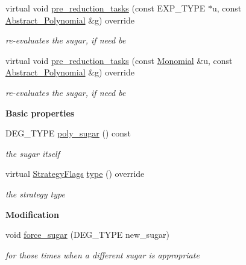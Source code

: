 \begin{DoxyCompactItemize}
virtual void \hyperlink{group__strategygroup_a284ca31b353017bdf4ea9b331218fff4}{pre\+\_\+reduction\+\_\+tasks} (const E\+X\+P\+\_\+\+T\+Y\+PE $\ast$u, const \hyperlink{group__polygroup_class_abstract___polynomial}{Abstract\+\_\+\+Polynomial} \&g) override
\begin{DoxyCompactList}\small\item\em re-\/evaluates the sugar, if need be \end{DoxyCompactList}\item 
virtual void \hyperlink{group__strategygroup_a845d9c0d53954a50fe3112e94b1cdfa8}{pre\+\_\+reduction\+\_\+tasks} (const \hyperlink{group__polygroup_class_monomial}{Monomial} \&u, const \hyperlink{group__polygroup_class_abstract___polynomial}{Abstract\+\_\+\+Polynomial} \&g) override
\begin{DoxyCompactList}\small\item\em re-\/evaluates the sugar, if need be \end{DoxyCompactList}\end{DoxyCompactItemize}
\begin{Indent}\textbf{ Basic properties}\par
\begin{DoxyCompactItemize}
\item 
\mbox{\label{group__strategygroup_a3b6ef678b640a3138e43882b9d2dca5f}} 
D\+E\+G\+\_\+\+T\+Y\+PE \hyperlink{group__strategygroup_a3b6ef678b640a3138e43882b9d2dca5f}{poly\+\_\+sugar} () const
\begin{DoxyCompactList}\small\item\em the sugar itself \end{DoxyCompactList}\item 
\mbox{\label{group__strategygroup_ac6e37acde82f22832ebbae2ab5fc8224}} 
virtual \hyperlink{group__strategygroup_ga0ee6c8e033547330e6b89929730007f4}{Strategy\+Flags} \hyperlink{group__strategygroup_ac6e37acde82f22832ebbae2ab5fc8224}{type} () override
\begin{DoxyCompactList}\small\item\em the strategy type \end{DoxyCompactList}\end{DoxyCompactItemize}
\end{Indent}
\begin{Indent}\textbf{ Modification}\par
\begin{DoxyCompactItemize}
\item 
\mbox{\label{group__strategygroup_a945416871509370e2222c8c7abe01759}} 
void \hyperlink{group__strategygroup_a945416871509370e2222c8c7abe01759}{force\+\_\+sugar} (D\+E\+G\+\_\+\+T\+Y\+PE new\+\_\+sugar)
\begin{DoxyCompactList}\small\item\em for those times when a different sugar is appropriate \end{DoxyCompactList}\end{DoxyCompactItemize}
\end{Indent}
